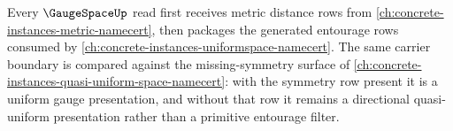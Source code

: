 Every $\GaugeSpaceUp$ read first receives metric distance rows from \autoref{ch:concrete-instances-metric-namecert}, then packages the generated entourage rows consumed by \autoref{ch:concrete-instances-uniformspace-namecert}. The same carrier boundary is compared against the missing-symmetry surface of \autoref{ch:concrete-instances-quasi-uniform-space-namecert}: with the symmetry row present it is a uniform gauge presentation, and without that row it remains a directional quasi-uniform presentation rather than a primitive entourage filter.
